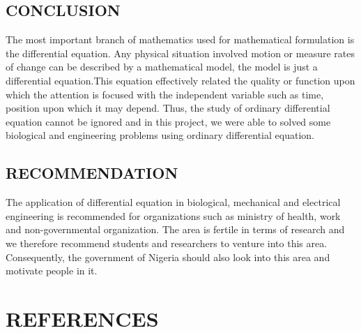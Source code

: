 \documentclass[11pt]{report}
\begin{document}
	
	\section{CONCLUSION}
	The most important branch of mathematics used for mathematical formulation is the differential equation.  Any physical situation involved motion or measure rates of change can be described by a mathematical model, the model is just a differential equation.This equation effectively related the quality or function upon which the attention is focused with the independent variable such as time, position upon which it may depend. Thus, the study of ordinary differential equation cannot be ignored and in this project, we were able to solved some biological and engineering problems using ordinary differential equation.\\
	
	
	\section{RECOMMENDATION}
	The application of differential equation in biological, mechanical and electrical engineering is recommended for organizations such as ministry of health, work and non-governmental organization. The area is fertile in terms of research and we therefore recommend students and researchers to venture into this area. Consequently, the government of Nigeria should also look into this area and motivate people in it.  
	
	
	\chapter*{REFERENCES}
	
\end{document}
